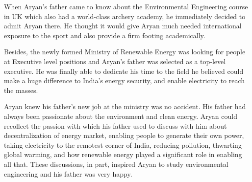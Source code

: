 When Aryan's father came to know about the Environmental Engineering course in
UK which also had a world-class archery academy, he immediately decided to admit
Aryan there. He thought it would give Aryan much needed international exposure
to the sport and also provide a firm footing academically.

Besides, the newly formed Ministry of Renewable Energy was looking for people at
Executive level positions and Aryan's father was selected as a top-level
executive. He was finally able to dedicate his time to the field he believed
could make a huge difference to India's energy security, and enable electricity
to reach the masses.

Aryan knew his father's new job at the ministry was no
accident. His father had always been passionate about the environment and clean
energy. Aryan could recollect the passion with which his father used to discuss
with him about decentralization of energy market, enabling people to generate
their own power, taking electricity to the remotest corner of India, reducing
pollution, thwarting global warming, and how renewable energy played a
significant role in enabling all that. These discussions, in part, inspired
Aryan to study environmental engineering and his father was very happy.